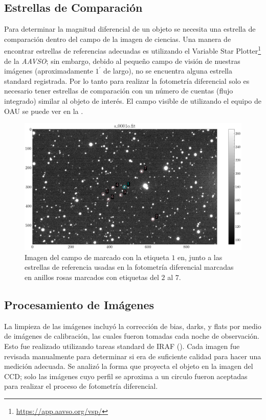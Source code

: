 \subsection{Estrellas de Comparación}

Para determinar la magnitud diferencial de un objeto se necesita una estrella de
comparación dentro del campo de la imagen de ciencias. Una manera de
encontrar estrellas de referencias adecuadas es utilizando el Variable Star
Plotter\footnote{\url{https://app.aavso.org/vsp/}} de la \textit{AAVSO}; sin
embargo, debido al pequeño campo de visión de nuestras imágenes
(aproximadamente $1^{\prime}$ de largo), no se encuentra alguna estrella
standard registrada. Por lo tanto para realizar la fotometría diferencial solo
es necesario tener estrellas de comparación con un número de cuentas (flujo
integrado) similar al objeto de interés. El campo visible de \atoObjId
utilizando el equipo de OAU se puede ver en la .

\begin{figure}[!ht]
	\centering
	\includegraphics[scale=0.5]{Observaciones/Secciones/Figures/Figura Campo Observado.png}
	\caption{Imagen del campo de \atoObjId marcado con la etiqueta $1$ en, 
	junto a las estrellas de referencia usadas en la fotometría diferencial 
	marcadas en anillos rosas marcados con etiquetas del $2$ al $7$.}
	\label{figuraCcdCampo}
\end{figure}

\subsection{Procesamiento de Imágenes}

La limpieza de las imágenes incluyó la corrección de bias, darks, y flats por
medio de imágenes de calibración, las cuales fueron tomadas cada noche de
observación. Esto fue realizado utilizando tareas standard de IRAF
(). Cada imagen fue revisada manualmente para
determinar si era de suficiente calidad para hacer una medición adecuada. Se
analizó la forma que proyecta el objeto en la imagen del CCD; solo las imágenes
cuyo perfil se aproxima a un circulo fueron aceptadas para realizar el proceso
de fotometría diferencial.

